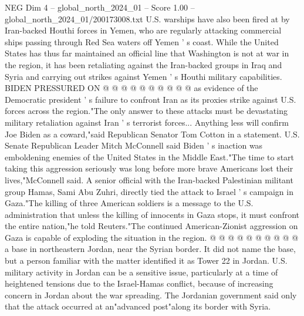 \begin{textsample}{NEG Dim 4 – global\_north\_2024\_01 – Score 1.00 – global\_north\_2024\_01/200173008.txt}
U.S. warships have also been fired at by Iran-backed Houthi forces in Yemen, who are regularly attacking commercial ships passing through Red Sea waters off Yemen ' s coast.
While the United States has thus far maintained an official line that Washington is not at war in the region, it has been retaliating against the Iran-backed groups in Iraq and Syria and carrying out strikes against Yemen ' s Houthi military capabilities.
BIDEN PRESSURED ON @ @ @ @ @ @ @ @ @ @ as evidence of the Democratic president ' s failure to confront Iran as its proxies strike against U.S. forces across the region."The only answer to these attacks must be devastating military retaliation against Iran ' s terrorist forces...
Anything less will confirm Joe Biden as a coward,"said Republican Senator Tom Cotton in a statement.
U.S.
Senate Republican Leader Mitch McConnell said Biden ' s inaction was emboldening enemies of the United States in the Middle East."The time to start taking this aggression seriously was long before more brave Americans lost their lives,"McConnell said.
A senior official with the Iran-backed Palestinian militant group Hamas, Sami Abu Zuhri, directly tied the attack to Israel ' s campaign in Gaza."The killing of three American soldiers is a message to the U.S. administration that unless the killing of innocents in Gaza stops, it must confront the entire nation,"he told Reuters."The continued American-Zionist aggression on Gaza is capable of exploding the situation in the region. @ @ @ @ @ @ @ @ @ @ a base in northeastern Jordan, near the Syrian border.
It did not name the base, but a person familiar with the matter identified it as Tower 22 in Jordan.
U.S. military activity in Jordan can be a sensitive issue, particularly at a time of heightened tensions due to the Israel-Hamas conflict, because of increasing concern in Jordan about the war spreading.
The Jordanian government said only that the attack occurred at an"advanced post"along its border with Syria.

\end{textsample}
